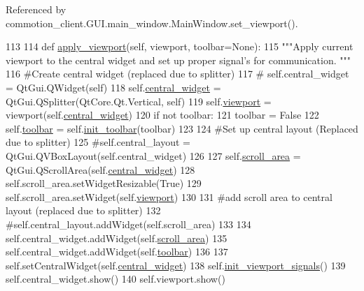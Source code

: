 Referenced by commotion\+\_\+client.\+G\+U\+I.\+main\+\_\+window.\+Main\+Window.\+set\+\_\+viewport().


\begin{DoxyCode}
113 
114     \textcolor{keyword}{def }\hyperlink{classcommotion__client_1_1GUI_1_1main__window_1_1MainWindow_a2972ac997218f50db2c18762ac48f23c}{apply\_viewport}(self, viewport, toolbar=None):
115         \textcolor{stringliteral}{"""Apply current viewport to the central widget and set up proper signal's for communication. """}
116         \textcolor{comment}{#Create central widget (replaced due to splitter)}
117         \textcolor{comment}{#        self.central\_widget = QtGui.QWidget(self)}
118         self.\hyperlink{classcommotion__client_1_1GUI_1_1main__window_1_1MainWindow_a6f0f7b66344ea647e8bdf9c73c94a3a4}{central\_widget} = QtGui.QSplitter(QtCore.Qt.Vertical, self)
119         self.\hyperlink{classcommotion__client_1_1GUI_1_1main__window_1_1MainWindow_a7399ad8133834fe65dca400825f008e7}{viewport} = viewport(self.\hyperlink{classcommotion__client_1_1GUI_1_1main__window_1_1MainWindow_a6f0f7b66344ea647e8bdf9c73c94a3a4}{central\_widget})
120         \textcolor{keywordflow}{if} \textcolor{keywordflow}{not} toolbar:
121             toolbar = \textcolor{keyword}{False}
122         self.\hyperlink{classcommotion__client_1_1GUI_1_1main__window_1_1MainWindow_a8ca81a512a5d12b59a8804d7fc0f3cc4}{toolbar} = self.\hyperlink{classcommotion__client_1_1GUI_1_1main__window_1_1MainWindow_a08bdbda447c256d0cf5355d928ebb3fe}{init\_toolbar}(toolbar)
123 
124         \textcolor{comment}{#Set up central layout (Replaced due to splitter)}
125         \textcolor{comment}{#self.central\_layout = QtGui.QVBoxLayout(self.central\_widget)}
126 
127         self.\hyperlink{classcommotion__client_1_1GUI_1_1main__window_1_1MainWindow_af8938670870bbbca1f3ddbd6c6f6dbc9}{scroll\_area} = QtGui.QScrollArea(self.\hyperlink{classcommotion__client_1_1GUI_1_1main__window_1_1MainWindow_a6f0f7b66344ea647e8bdf9c73c94a3a4}{central\_widget})
128         self.scroll\_area.setWidgetResizable(\textcolor{keyword}{True})
129         self.scroll\_area.setWidget(self.\hyperlink{classcommotion__client_1_1GUI_1_1main__window_1_1MainWindow_a7399ad8133834fe65dca400825f008e7}{viewport})
130 
131         \textcolor{comment}{#add scroll area to central layout (replaced due to splitter)}
132         \textcolor{comment}{#self.central\_layout.addWidget(self.scroll\_area)}
133 
134         self.central\_widget.addWidget(self.\hyperlink{classcommotion__client_1_1GUI_1_1main__window_1_1MainWindow_af8938670870bbbca1f3ddbd6c6f6dbc9}{scroll\_area})
135         self.central\_widget.addWidget(self.\hyperlink{classcommotion__client_1_1GUI_1_1main__window_1_1MainWindow_a8ca81a512a5d12b59a8804d7fc0f3cc4}{toolbar})
136         
137         self.setCentralWidget(self.\hyperlink{classcommotion__client_1_1GUI_1_1main__window_1_1MainWindow_a6f0f7b66344ea647e8bdf9c73c94a3a4}{central\_widget})
138         self.\hyperlink{classcommotion__client_1_1GUI_1_1main__window_1_1MainWindow_abf5e8a0add7f4fa1480c825a74e0e9b9}{init\_viewport\_signals}()
139         self.central\_widget.show()
140         self.viewport.show()

\end{DoxyCode}
